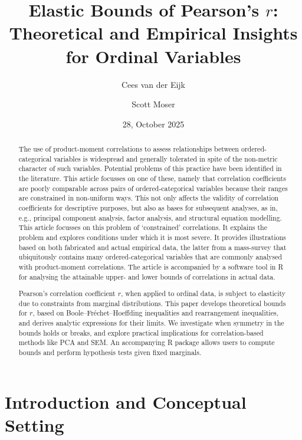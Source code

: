\documentclass[
  12pt,
]{article}
\title{Elastic Bounds of Pearson's \(r\): Theoretical and Empirical
Insights for Ordinal Variables}
\author{Cees van der Eijk \and Scott Moser}
\date{28, October 2025}
\theoremstyle{plain}
\theoremstyle{definition}
\renewcommand*\contentsname{Table of contents}
\newcommand\contentsname{Table of contents}
\theoremstyle{remark}
\begin{document}
\maketitle

\renewcommand*\contentsname{Table of contents}
{
\hypersetup{linkcolor=}
\setcounter{tocdepth}{3}
\tableofcontents
}

\newpage

\begin{abstract}
The use of product-moment correlations to assess relationships between ordered-categorical variables is widespread and generally tolerated in spite of the non-metric character of such variables. Potential problems of this practice have been identified in the literature. This article focusses on one of these, namely that correlation coefficients are poorly comparable across pairs of ordered-categorical variables because their ranges are constrained in non-uniform ways. This not only affects the validity of correlation coefficients for descriptive purposes, but also as bases for subsequent analyses, as in, e.g., principal component analysis, factor analysis, and structural equation modelling. This article focusses on this problem of ‘constrained’ correlations. It explains the problem and explores conditions under which it is most severe. It provides illustrations based on both fabricated and actual empirical data, the latter from a mass-survey that ubiquitously contains many ordered-categorical variables that are commonly analysed with product-moment correlations. The article is accompanied by a software tool in R for analysing the attainable upper- and lower bounds of correlations in actual data. 

Pearson’s correlation coefficient $r$, when applied to ordinal data, is subject to elasticity due to constraints from marginal distributions. This paper develops theoretical bounds for $r$, based on Boole–Fréchet–Hoeffding inequalities and rearrangement inequalities, and derives analytic expressions for their limits. We investigate when symmetry in the bounds holds or breaks, and explore practical implications for correlation-based methods like PCA and SEM. An accompanying R package allows users to compute bounds and perform hypothesis tests given fixed marginals.
\end{abstract}

\newpage

\newpage

\section{Introduction and Conceptual
Setting}\label{introduction-and-conceptual-setting}
\end{document}
